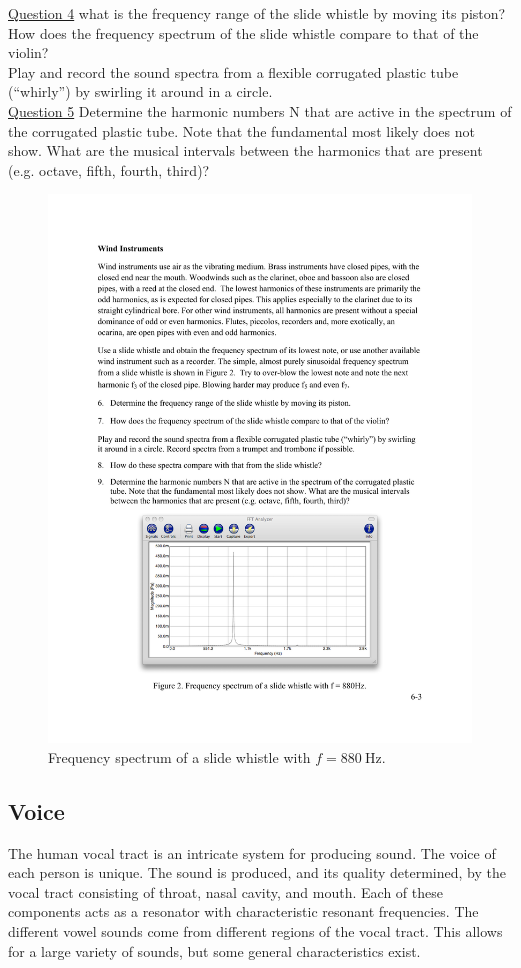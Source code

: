 \documentclass[11pt]{NSF}
\begin{document}
\underline{Question 4} what is the frequency range of the slide whistle by moving its piston?
How does the frequency spectrum of the slide whistle compare to that of the violin? \\

Play and record the sound spectra from a flexible corrugated plastic tube (“whirly”) by swirling
it around in a circle. \\

\underline{Question 5} Determine the harmonic numbers N that are active in the spectrum of the corrugated plastic
tube. Note that the fundamental most likely does not show. What are the musical intervals
between the harmonics that are present (e.g. octave, fifth, fourth, third)?

%
\begin{figure}[hbtp]
\begin{center}
\includegraphics[width=.6\textwidth]{fig6_2}
\caption{Frequency spectrum of a slide whistle with 
$f =880~\textrm{Hz}$.}
\label{f:2}
\end{center}
\end{figure}


\subsection{Voice}

The human vocal tract is an intricate system for producing sound. The
voice of each person is unique. The sound is produced, and its quality
determined, by the vocal tract consisting of throat, nasal cavity, and
mouth. Each of these components acts as a resonator with
characteristic resonant frequencies. The different vowel sounds come
from different regions of the vocal tract. This allows for a large
variety of sounds, but some general characteristics exist. \\
\end{document}
